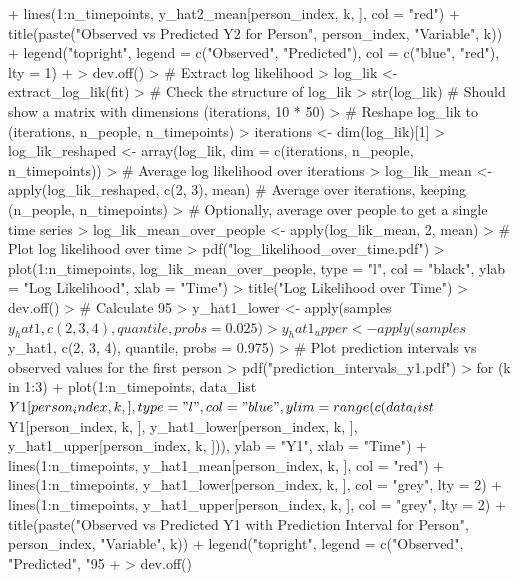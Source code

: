 \documentclass{article}
\begin{document}
\begin{Schunk}
\begin{Sinput}
{+   lines(1:n_timepoints, y_hat2_mean[person_index, k, ], col = "red")
+   title(paste("Observed vs Predicted Y2 for Person", person_index, "Variable", k))
+   legend("topright", legend = c("Observed", "Predicted"), col = c("blue", "red"), lty = 1)
+ }
> dev.off()
> # Extract log likelihood
> log_lik <- extract_log_lik(fit)
> # Check the structure of log_lik
> str(log_lik)  # Should show a matrix with dimensions (iterations, 10 * 50)
> # Reshape log_lik to (iterations, n_people, n_timepoints)
> iterations <- dim(log_lik)[1]
> log_lik_reshaped <- array(log_lik, dim = c(iterations, n_people, n_timepoints))
> # Average log likelihood over iterations
> log_lik_mean <- apply(log_lik_reshaped, c(2, 3), mean)  # Average over iterations, keeping (n_people, n_timepoints)
> # Optionally, average over people to get a single time series
> log_lik_mean_over_people <- apply(log_lik_mean, 2, mean)
> # Plot log likelihood over time
> pdf("log_likelihood_over_time.pdf")
> plot(1:n_timepoints, log_lik_mean_over_people, type = "l", col = "black", ylab = "Log Likelihood", xlab = "Time")
> title("Log Likelihood over Time")
> dev.off()
> # Calculate 95%
> y_hat1_lower <- apply(samples$y_hat1, c(2, 3, 4), quantile, probs = 0.025)
> y_hat1_upper <- apply(samples$y_hat1, c(2, 3, 4), quantile, probs = 0.975)
> # Plot prediction intervals vs observed values for the first person
> pdf("prediction_intervals_y1.pdf")
> for (k in 1:3) {
+   plot(1:n_timepoints, data_list$Y1[person_index, k, ], type = "l", col = "blue", ylim = range(c(data_list$Y1[person_index, k, ], y_hat1_lower[person_index, k, ], y_hat1_upper[person_index, k, ])), ylab = "Y1", xlab = "Time")
+   lines(1:n_timepoints, y_hat1_mean[person_index, k, ], col = "red")
+   lines(1:n_timepoints, y_hat1_lower[person_index, k, ], col = "grey", lty = 2)
+   lines(1:n_timepoints, y_hat1_upper[person_index, k, ], col = "grey", lty = 2)
+   title(paste("Observed vs Predicted Y1 with Prediction Interval for Person", person_index, "Variable", k))
+   legend("topright", legend = c("Observed", "Predicted", "95%
+ }
> dev.off()
\end{Sinput}
\end{Schunk}
\end{document}
